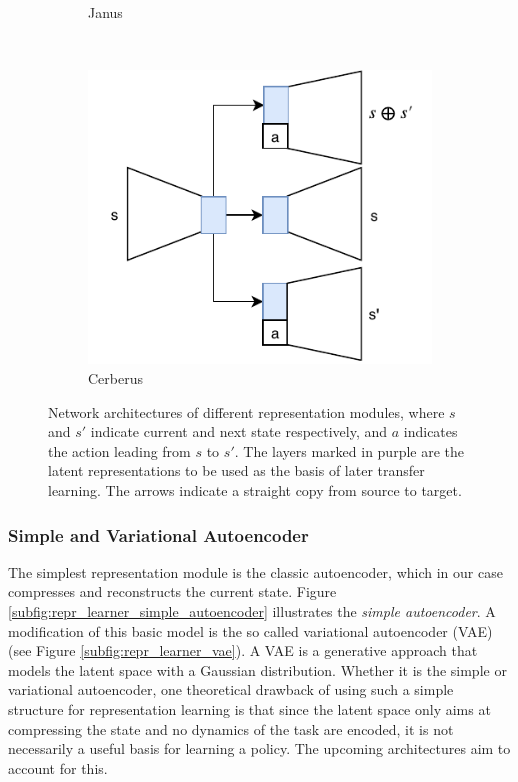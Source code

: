 \begin{figure}[t!]
\begin{subfigure}{0.5\columnwidth}
		\caption{Janus}
		\label{subfig:repr_learner_janus}
	\end{subfigure}%
	~ 
	\begin{subfigure}{0.5\columnwidth}
		\centering
		\includegraphics[width=\linewidth]{img/cerberus_v2.pdf}
		\caption{Cerberus}
		\label{subfig:repr_learner_cerberus}
	\end{subfigure}
	\caption{Network architectures of different representation modules, where $s$ and $s'$ indicate current and next state respectively, and $a$ indicates the action leading from $s$ to $s'$. 
	The layers marked in purple are the latent representations to be used as the basis of later transfer learning. 
	The arrows indicate a straight copy from source to target.
	}
	\label{fig:repr_learner}
\end{figure}

\subsubsection{Simple and Variational Autoencoder}
The simplest representation module is the classic autoencoder, which in our case compresses and reconstructs the current state. Figure \ref{subfig:repr_learner_simple_autoencoder} illustrates the \textit{simple autoencoder}.  A modification of this basic model is the so called variational autoencoder (VAE) (see Figure \ref{subfig:repr_learner_vae}). A VAE is a generative approach that models the latent space with a Gaussian distribution. Whether it is the simple or variational autoencoder, one theoretical drawback of using such a simple structure for representation learning is that since the latent space only aims at compressing the state and no dynamics of the task are encoded, it is not necessarily a useful basis for learning a policy. The upcoming architectures aim to account for this.

